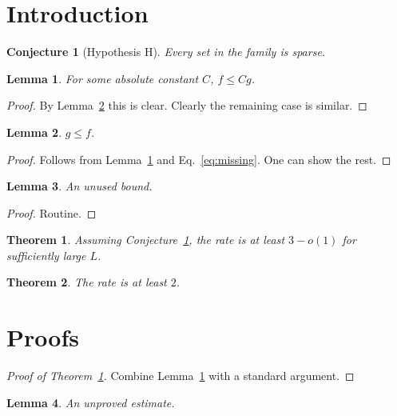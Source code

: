 \documentclass{article}
\newtheorem{theorem}{Theorem}
\newtheorem{lemma}{Lemma}
\newtheorem{conj}{Conjecture}
\newcommand{\eps}{\varepsilon}
\begin{document}
\begin{abstract}Test.\end{abstract}
\section{Introduction}
\begin{conj}[Hypothesis H]\label{conj:H} Every set in the family is sparse.\end{conj}
\begin{lemma}\label{lem:a} For some absolute constant $C$, $f \le C g$.\end{lemma}
\begin{proof} By Lemma~\ref{lem:b} this is clear. Clearly the remaining case is similar.\end{proof}
\begin{lemma}\label{lem:b} $g \le f$.\end{lemma}
\begin{proof} Follows from Lemma~\ref{lem:a} and Eq.~\eqref{eq:missing}. One can show the rest.\end{proof}
\begin{lemma}\label{lem:unused} An unused bound.\end{lemma}
\begin{proof} Routine.\end{proof}
\begin{theorem}\label{thm:main} Assuming Conjecture~\ref{conj:H}, the rate is at least $3-o(1)$ for sufficiently large $L$.\end{theorem}
\begin{theorem}\label{thm:second} The rate is at least $2$.\end{theorem}
\section{Proofs}
\begin{proof}[Proof of Theorem~\ref{thm:main}] Combine Lemma~\ref{lem:a} with a standard argument.\end{proof}
\begin{lemma}\label{lem:noproof} An unproved estimate.\end{lemma}
\renewcommand{\eps}{\epsilon}
\end{document}
